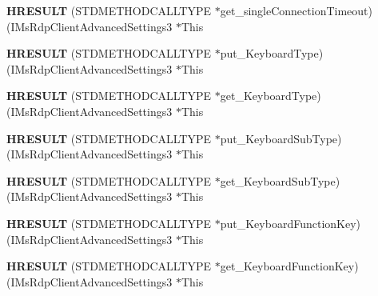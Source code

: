 \begin{DoxyCompactItemize}
{\bfseries H\+R\+E\+S\+U\+LT} (S\+T\+D\+M\+E\+T\+H\+O\+D\+C\+A\+L\+L\+T\+Y\+PE $\ast$get\+\_\+single\+Connection\+Timeout)(I\+Ms\+Rdp\+Client\+Advanced\+Settings3 $\ast$This
\item 
\mbox{\label{struct_i_ms_rdp_client_advanced_settings3_vtbl_a4156d6f8172a544c782cd1b3e7b8b5c2}} 
{\bfseries H\+R\+E\+S\+U\+LT} (S\+T\+D\+M\+E\+T\+H\+O\+D\+C\+A\+L\+L\+T\+Y\+PE $\ast$put\+\_\+\+Keyboard\+Type)(I\+Ms\+Rdp\+Client\+Advanced\+Settings3 $\ast$This
\item 
\mbox{\label{struct_i_ms_rdp_client_advanced_settings3_vtbl_a7e98e4d5c511078fe68d8e90477562da}} 
{\bfseries H\+R\+E\+S\+U\+LT} (S\+T\+D\+M\+E\+T\+H\+O\+D\+C\+A\+L\+L\+T\+Y\+PE $\ast$get\+\_\+\+Keyboard\+Type)(I\+Ms\+Rdp\+Client\+Advanced\+Settings3 $\ast$This
\item 
\mbox{\label{struct_i_ms_rdp_client_advanced_settings3_vtbl_a9bbac12a3c58c42809a5d9f60a73ab6a}} 
{\bfseries H\+R\+E\+S\+U\+LT} (S\+T\+D\+M\+E\+T\+H\+O\+D\+C\+A\+L\+L\+T\+Y\+PE $\ast$put\+\_\+\+Keyboard\+Sub\+Type)(I\+Ms\+Rdp\+Client\+Advanced\+Settings3 $\ast$This
\item 
\mbox{\label{struct_i_ms_rdp_client_advanced_settings3_vtbl_a41c696d7f5254dfc38ff8e934c5c3fb0}} 
{\bfseries H\+R\+E\+S\+U\+LT} (S\+T\+D\+M\+E\+T\+H\+O\+D\+C\+A\+L\+L\+T\+Y\+PE $\ast$get\+\_\+\+Keyboard\+Sub\+Type)(I\+Ms\+Rdp\+Client\+Advanced\+Settings3 $\ast$This
\item 
\mbox{\label{struct_i_ms_rdp_client_advanced_settings3_vtbl_a7469ae799146e2f42285d49561d21384}} 
{\bfseries H\+R\+E\+S\+U\+LT} (S\+T\+D\+M\+E\+T\+H\+O\+D\+C\+A\+L\+L\+T\+Y\+PE $\ast$put\+\_\+\+Keyboard\+Function\+Key)(I\+Ms\+Rdp\+Client\+Advanced\+Settings3 $\ast$This
\item 
\mbox{\label{struct_i_ms_rdp_client_advanced_settings3_vtbl_aea7d101f80b0a23245bd3648e6d318b9}} 
{\bfseries H\+R\+E\+S\+U\+LT} (S\+T\+D\+M\+E\+T\+H\+O\+D\+C\+A\+L\+L\+T\+Y\+PE $\ast$get\+\_\+\+Keyboard\+Function\+Key)(I\+Ms\+Rdp\+Client\+Advanced\+Settings3 $\ast$This

\end{DoxyCompactItemize}
